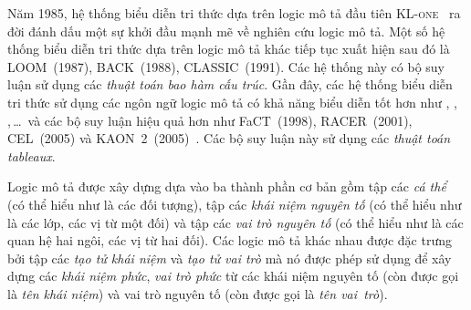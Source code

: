 Năm 1985, hệ thống biểu diễn tri thức dựa trên logic mô tả đầu tiên \textsc{KL-one}~\cite{Schmolze1983,Brachman1986} ra đời đánh dấu một sự khởi đầu mạnh mẽ về nghiên cứu logic mô tả. Một số hệ thống biểu diễn tri thức dựa trên logic mô tả khác tiếp tục xuất hiện sau đó là LOOM~(1987), BACK~(1988), CLASSIC~(1991). Các hệ thống này có bộ suy luận sử dụng các {\em thuật toán bao hàm cấu trúc}. Gần đây, các hệ thống biểu diễn tri thức sử dụng các ngôn ngữ logic mô tả có khả năng biểu diễn tốt hơn như \SHOIN, \SHOIQ, \SROIQ,\,\ldots\, và các bộ suy luận hiệu quả hơn như FaCT~(1998), RACER~(2001), CEL~(2005) và KAON~2~(2005)~\cite{Sattler2014}. Các bộ suy luận này sử dụng các {\em thuật toán tableaux}.

Logic mô tả được xây dựng dựa vào ba thành phần cơ bản gồm tập các {\em cá thể} (có thể hiểu như là các đối tượng), tập các {\em khái niệm nguyên tố} (có thể hiểu như là các lớp, các vị từ một đối) và tập các {\em vai trò nguyên tố} (có thể hiểu như là các quan hệ hai ngôi, các vị từ hai đối).
%
Các logic mô tả khác nhau được đặc trưng bởi tập các {\em tạo tử khái niệm} và {\em tạo tử vai trò} mà nó được phép sử dụng để xây dựng các {\em khái niệm phức}, {\em vai trò phức} từ các khái niệm nguyên tố (còn được gọi là {\em tên khái niệm}) và vai trò nguyên tố (còn được gọi là {\em tên vai~trò}).

